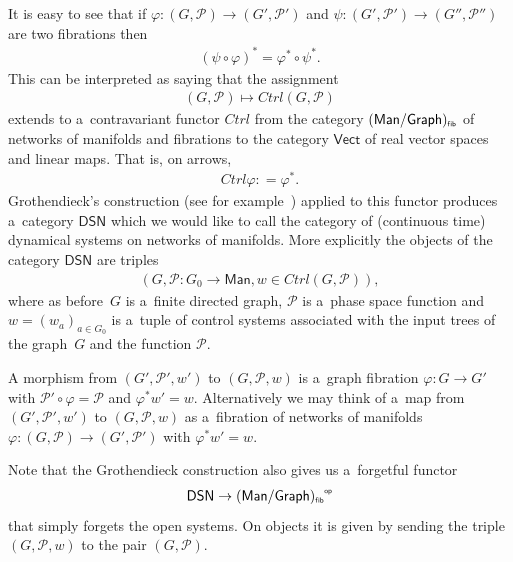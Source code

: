 \documentclass[10pt,a4paper]{amsart}
\numberwithin{equation}{section}
\newcommand{\op}[1]{{#1}^{\mbox{\sf{\tiny{op}}}}}
\renewcommand{\mathpzc}[1]{\mathit{#1}}
\begin{document}
\begin{Remark}
It is easy to see that if $\varphi:(G,{\mathcal P}) \to (G',{\mathcal P}')$ and $\psi:(G',{\mathcal P}')\to (G'',
{\mathcal P}'')$ are two f\/ibrations then
\begin{gather*}
(\psi\circ \varphi)^* = \varphi^*\circ \psi^*.
\end{gather*}
This can be interpreted as saying that the assignment
\begin{gather*}
(G,{\mathcal P})\mapsto \mathpzc{Ctrl}(G,{\mathcal P})
\end{gather*}
extends to a~contravariant functor $\mathpzc{Ctrl}$ from the category
$(\mathsf{Man}/\mathsf{Graph})_{\mbox{\sf{\tiny{f\/ib}}}} $ of networks of manifolds and f\/ibrations to the category
$\mathsf{Vect}$ of real vector spaces and linear maps.
That is, on arrows,
\begin{gather*}
\mathpzc{Ctrl}{\varphi}: = \varphi^*.
\end{gather*}
Grothendieck's construction (see for example~\cite{Awodey}) applied to this functor produces a~category $\mathsf{DSN}$
which we would like to call the category of (continuous time) dynamical systems on networks of manifolds.
More explicitly the objects of the category $\mathsf{DSN}$ are triples
\begin{gather*}
(G, {\mathcal P}\colon G_0 \to \mathsf{Man}, w\in \mathpzc{Ctrl}(G,{\mathcal P})),
\end{gather*}
where as before~$G$ is a~f\/inite directed graph, ${\mathcal P}$ is a~phase space function and $w=(w_a)_{a\in G_0}$ is
a~tuple of control systems associated with the input trees of the graph~$G$ and the function ${\mathcal P}$.

A morphism from $(G',{\mathcal P}', w')$ to $(G, {\mathcal P},w)$ is a~graph f\/ibration $\varphi\colon G\to G'$ with
${\mathcal P}' \circ \varphi = {\mathcal P}$ and $\varphi^*w' = w$.
Alternatively we may think of a~map from $(G',{\mathcal P}', w')$ to $(G, {\mathcal P},w)$ as a~f\/ibration of networks of
manifolds $\varphi\colon (G,{\mathcal P}) \to (G',{\mathcal P}')$ with $\varphi^*w' = w$.

Note that the Grothendieck construction also gives us a~forgetful functor
\begin{gather*}
\mathsf{DSN} \to \op{(\mathsf{Man}/\mathsf{Graph})_{\mbox{\sf{\tiny{f\/ib}}}}}
\end{gather*}
that simply forgets the open systems.
On objects it is given by sending the triple $(G,{\mathcal P}, w)$ to the pair $(G,{\mathcal P})$.
\end{Remark}
\end{document}
